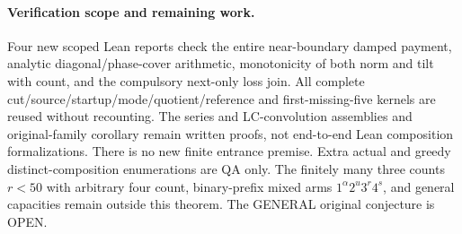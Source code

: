 \paragraph{Verification scope and remaining work.}
Four new scoped Lean reports check the entire near-boundary damped
payment, analytic diagonal/phase-cover arithmetic, monotonicity of
both norm and tilt with count, and the compulsory next-only loss
join. All complete cut/source/startup/mode/quotient/reference and
first-missing-five kernels are reused without recounting. The series
and LC-convolution assemblies and original-family corollary remain
written proofs, not end-to-end Lean composition formalizations.
There is no new finite entrance premise. Extra actual and greedy
distinct-composition enumerations are QA only.
The finitely many three counts $r<50$ with arbitrary four count,
binary-prefix mixed arms $1^\alpha2^u3^r4^s$, and general capacities
remain outside this theorem. The GENERAL original conjecture is OPEN.
